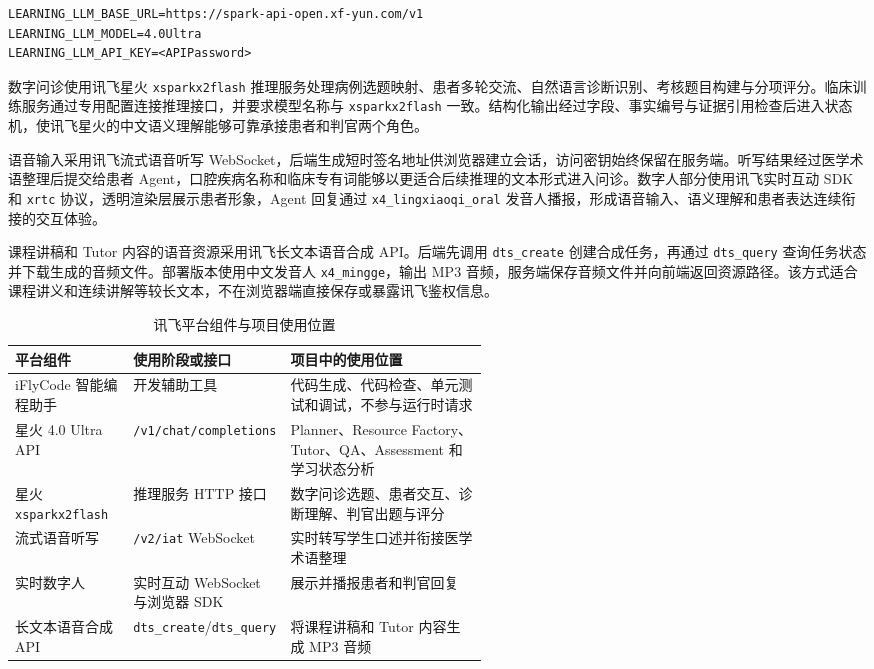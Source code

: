 \begin{lstlisting}
LEARNING_LLM_BASE_URL=https://spark-api-open.xf-yun.com/v1
LEARNING_LLM_MODEL=4.0Ultra
LEARNING_LLM_API_KEY=<APIPassword>
\end{lstlisting}

数字问诊使用讯飞星火 \texttt{xsparkx2flash} 推理服务处理病例选题映射、患者多轮交流、自然语言诊断识别、考核题目构建与分项评分。临床训练服务通过专用配置连接推理接口，并要求模型名称与 \texttt{xsparkx2flash} 一致。结构化输出经过字段、事实编号与证据引用检查后进入状态机，使讯飞星火的中文语义理解能够可靠承接患者和判官两个角色。

语音输入采用讯飞流式语音听写 WebSocket，后端生成短时签名地址供浏览器建立会话，访问密钥始终保留在服务端。听写结果经过医学术语整理后提交给患者 Agent，口腔疾病名称和临床专有词能够以更适合后续推理的文本形式进入问诊。数字人部分使用讯飞实时互动 SDK 和 \texttt{xrtc} 协议，透明渲染层展示患者形象，Agent 回复通过 \texttt{x4\_lingxiaoqi\_oral} 发音人播报，形成语音输入、语义理解和患者表达连续衔接的交互体验。

课程讲稿和 Tutor 内容的语音资源采用讯飞长文本语音合成 API。后端先调用 \texttt{dts\_create} 创建合成任务，再通过 \texttt{dts\_query} 查询任务状态并下载生成的音频文件。部署版本使用中文发音人 \texttt{x4\_mingge}，输出 MP3 音频，服务端保存音频文件并向前端返回资源路径。该方式适合课程讲义和连续讲解等较长文本，不在浏览器端直接保存或暴露讯飞鉴权信息。

\begin{table}[H]
  \centering
  \caption{讯飞平台组件与项目使用位置}
  \label{tab:xfyun-integration}
  \begin{tabularx}{\linewidth}{p{0.25\linewidth}p{0.30\linewidth}X}
    \toprule
    平台组件 & 使用阶段或接口 & 项目中的使用位置 \\
    \midrule
    iFlyCode 智能编程助手 & 开发辅助工具 & 代码生成、代码检查、单元测试和调试，不参与运行时请求 \\
    星火 4.0 Ultra API & \texttt{/v1/chat/completions} & Planner、Resource Factory、Tutor、QA、Assessment 和学习状态分析 \\
    星火 \texttt{xsparkx2flash} & 推理服务 HTTP 接口 & 数字问诊选题、患者交互、诊断理解、判官出题与评分 \\
    流式语音听写 & \texttt{/v2/iat} WebSocket & 实时转写学生口述并衔接医学术语整理 \\
    实时数字人 & 实时互动 WebSocket 与浏览器 SDK & 展示并播报患者和判官回复 \\
    长文本语音合成 API & \texttt{dts\_create}/\texttt{dts\_query} & 将课程讲稿和 Tutor 内容生成 MP3 音频 \\
    \bottomrule
  \end{tabularx}
\end{table}


